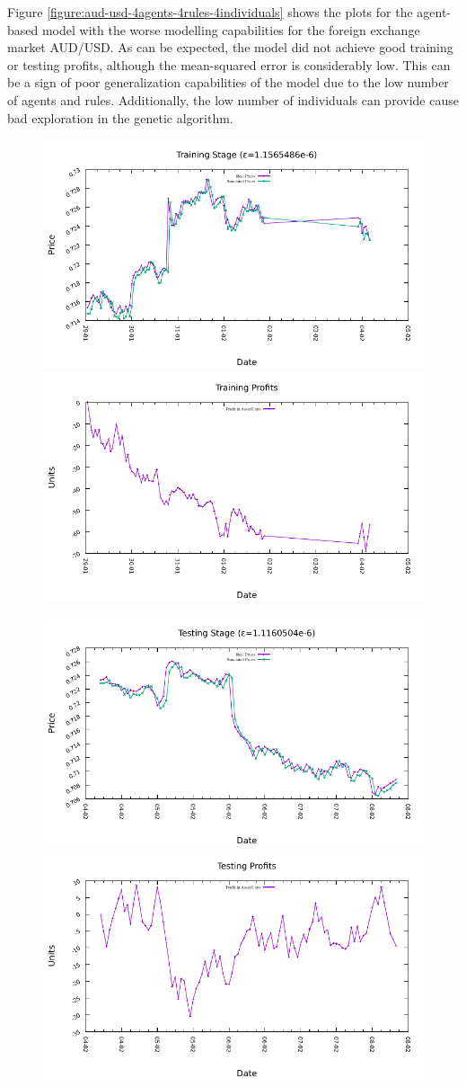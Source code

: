 Figure \ref{figure:aud-usd-4agents-4rules-4individuals} shows the plots for the agent-based model with the worse modelling capabilities for the foreign exchange market AUD/USD. As can be expected, the model did not achieve good training or testing profits, although the mean-squared error is considerably low. This can be a sign of poor generalization capabilities of the model due to the low number of agents and rules. Additionally, the low number of individuals can provide cause bad exploration in the genetic algorithm.

\begin{figure}[htp]
  \centering

  \includegraphics[width=.45\textwidth]{img/plots/aud_usd_h1-4agents-4rules-4ind-100gen_training_fit.pdf}\quad
  \includegraphics[width=.45\textwidth]{img/plots/aud_usd_h1-4agents-4rules-4ind-100gen_training_profits.pdf}

  \medskip

  \includegraphics[width=.45\textwidth]{img/plots/aud_usd_h1-4agents-4rules-4ind-100gen_testing_fit.pdf}\quad
  \includegraphics[width=.45\textwidth]{img/plots/aud_usd_h1-4agents-4rules-4ind-100gen_testing_profits.pdf}


\end{figure}
